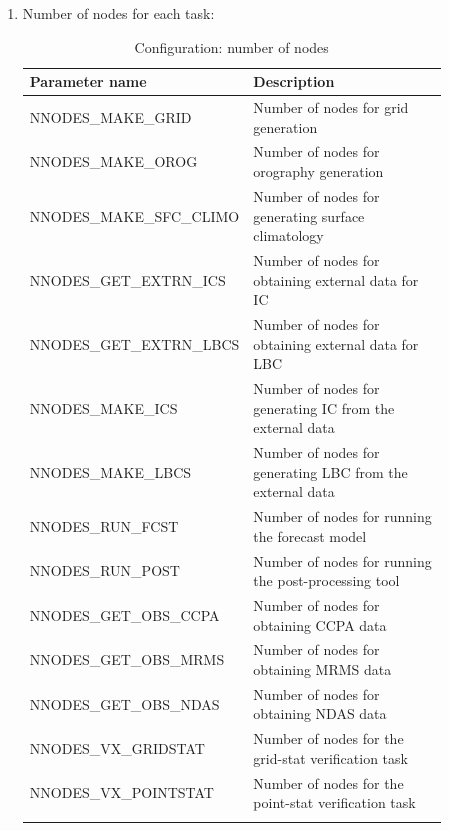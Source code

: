 \documentclass[11pt,fleqn]{report}              %
\begin{document}
\begin{enumerate}
\item Number of nodes for each task: 
{
\scriptsize
\begin{longtable}{ p{0.32\linewidth} | p{0.55\linewidth} }
\hline
\hline
Parameter name & Description \\
\hline
NNODES\_MAKE\_GRID & Number of nodes for grid generation \\
NNODES\_MAKE\_OROG & Number of nodes for orography generation \\
NNODES\_MAKE\_SFC\_CLIMO & Number of nodes for generating surface climatology  \\
NNODES\_GET\_EXTRN\_ICS & Number of nodes for obtaining external data for IC \\
NNODES\_GET\_EXTRN\_LBCS & Number of nodes for obtaining external data for LBC \\
NNODES\_MAKE\_ICS & Number of nodes for generating IC from the external data  \\
NNODES\_MAKE\_LBCS & Number of nodes for generating LBC from the external data \\
NNODES\_RUN\_FCST & Number of nodes for running the forecast model \\
NNODES\_RUN\_POST & Number of nodes for running the post-processing tool  \\
NNODES\_GET\_OBS\_CCPA & Number of nodes for obtaining CCPA data \\
NNODES\_GET\_OBS\_MRMS & Number of nodes for obtaining MRMS data \\
NNODES\_GET\_OBS\_NDAS & Number of nodes for obtaining NDAS data \\
NNODES\_VX\_GRIDSTAT & Number of nodes for the grid-stat verification task \\
NNODES\_VX\_POINTSTAT & Number of nodes for the point-stat verification task \\
\hline
\caption{Configuration: number of nodes }
\label{table:config_nnodes}
\end{longtable}
}


\end{enumerate}
\end{document}
